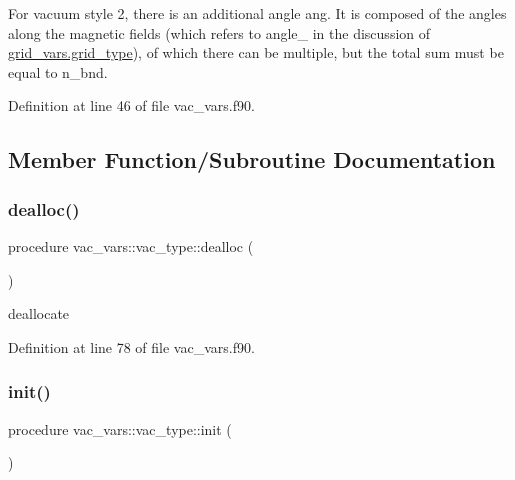 For vacuum style 2, there is an additional angle {\ttfamily ang}. It is composed of the angles along the magnetic fields (which refers to {\ttfamily angle\+\_} in the discussion of {\ttfamily \hyperlink{structgrid__vars_1_1grid__type}{grid\+\_\+vars.\+grid\+\_\+type}}), of which there can be multiple, but the total sum must be equal to {\ttfamily n\+\_\+bnd}. 

Definition at line 46 of file vac\+\_\+vars.\+f90.



\subsection{Member Function/\+Subroutine Documentation}
\mbox{\label{structvac__vars_1_1vac__type_ab183b5ee11feae9e29b8b9710a48c577}} 
\subsubsection{\texorpdfstring{dealloc()}{dealloc()}}
{\footnotesize\ttfamily procedure vac\+\_\+vars\+::vac\+\_\+type\+::dealloc (\begin{DoxyParamCaption}{ }\end{DoxyParamCaption})}



deallocate 



Definition at line 78 of file vac\+\_\+vars.\+f90.

\mbox{\label{structvac__vars_1_1vac__type_a8ae602ebb68bb7e2e31cd248a0671f9e}} 
\subsubsection{\texorpdfstring{init()}{init()}}
{\footnotesize\ttfamily procedure vac\+\_\+vars\+::vac\+\_\+type\+::init (\begin{DoxyParamCaption}{ }\end{DoxyParamCaption})}



